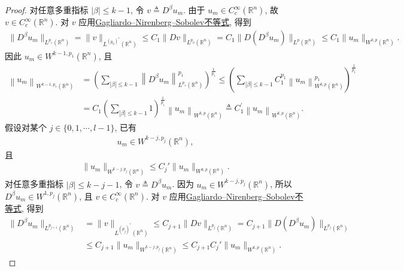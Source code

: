 \documentclass[../../main.tex]{subfiles}
\begin{document}
\begin{proof}
对任意多重指标 $|\beta|\leqslant k-1$, 令 $v\triangleq D^{\beta}u_{m}$. 由于 $u_{m}\in C_{c}^{\infty}(\mathbb{R}^{n})$, 故 $v\in C_{c}^{\infty}(\mathbb{R}^{n})$. 对 $v$ 应用\hyperref[theorem:Gagliardo--Nirenberg--Sobolev不等式]{Gagliardo--Nirenberg--Sobolev不等式}, 得到
\begin{align}\label{eq::jijwIIJEI9-2-first}
\|D^{\beta}u_{m}\|_{L^{p_{1}}(\mathbb{R}^{n})}
=\|v\|_{L^{(p_{0})^{*}}(\mathbb{R}^{n})}\leqslant C_{1}\|Dv\|_{L^{p_{0}}(\mathbb{R}^{n})}=C_{1}\|D(D^{\beta}u_{m})\|_{L^{p}(\mathbb{R}^{n})}\leqslant C_{1}\|u_{m}\|_{W^{k,p}(\mathbb{R}^{n})}.
\end{align}
因此 $u_{m}\in W^{k-1,p_{1}}(\mathbb{R}^{n})$, 且
\begin{align*}
\left\| u_m \right\| _{W^{k-1,p_1}\left( \mathbb{R} ^n \right)}&=\left( \sum_{\left| \beta \right|\leqslant k-1}{\left\| D^{\beta}u_m \right\| _{L^{p_1}\left( \mathbb{R} ^n \right)}^{p_1}} \right) ^{\frac{1}{p_1}}\leqslant \left( \sum_{\left| \beta \right|\leqslant k-1}{C_1^{p_1}\left\| u_m \right\| _{W^{k,p}\left( \mathbb{R} ^n \right)}^{p_1}} \right) ^{\frac{1}{p_1}}
\\&=C_{1}\left( \sum_{\left| \beta \right|\leqslant k-1}{1} \right) ^{\frac{1}{p_1}}\left\| u_m \right\| _{W^{k,p}\left( \mathbb{R} ^n \right)}\triangleq C_{1}^{\prime}\left\| u_m \right\| _{W^{k,p}\left( \mathbb{R} ^n \right)}.
\end{align*}
假设对某个 $j\in\{0,1,\cdots,l-1\}$, 已有
\begin{align*}
u_{m}\in W^{k-j,p_{j}}(\mathbb{R}^{n}),
\end{align*}
且
\begin{align*}
\|u_{m}\|_{W^{k-j,p_{j}}(\mathbb{R}^{n})}\leqslant C_{j}'\|u_{m}\|_{W^{k,p}(\mathbb{R}^{n})}.
\end{align*}
对任意多重指标 $|\beta|\leqslant k-j-1$, 令 $v\triangleq D^{\beta}u_{m}$. 因为 $u_{m}\in W^{k-j,p_{j}}(\mathbb{R}^{n})$, 所以 $D^{\beta}u_{m}\in W^{1,p_{j}}(\mathbb{R}^{n})$, 且 $v\in C_{c}^{\infty}(\mathbb{R}^{n})$. 对 $v$ 应用\hyperref[theorem:Gagliardo--Nirenberg--Sobolev不等式]{Gagliardo--Nirenberg--Sobolev不等式}, 得到
\begin{align*}
\|D^{\beta}u_{m}\|_{L^{p_{j+1}}(\mathbb{R}^{n})}
&=\|v\|_{L^{(p_{j})^{*}}(\mathbb{R}^{n})}\leqslant C_{j+1}\|Dv\|_{L^{p_{j}}(\mathbb{R}^{n})}=C_{j+1}\|D(D^{\beta}u_{m})\|_{L^{p_{j}}(\mathbb{R}^{n})}\\
&\leqslant C_{j+1}\|u_{m}\|_{W^{k-j,p_{j}}(\mathbb{R}^{n})}\leqslant C_{j+1}C_{j}'\|u_{m}\|_{W^{k,p}(\mathbb{R}^{n})}.
\end{align*}

\end{proof}
\end{document}
